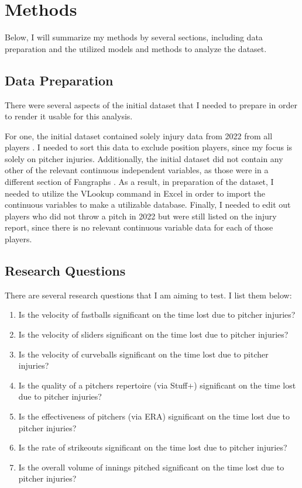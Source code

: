 \documentclass{article}
\begin{document}
\section{Methods}

Below, I will summarize my methods by several sections, including data preparation and the utilized models and methods to analyze the dataset.

\subsection{Data Preparation}

There were several aspects of the initial dataset that I needed to prepare in order to render it usable for this analysis. 

For one, the initial dataset contained solely injury data from 2022 from all players \citet{fginjurydata}. I needed to sort this data to exclude position players, since my focus is solely on pitcher injuries. Additionally, the initial dataset did not contain any other of the relevant continuous independent variables, as those were in a different section of Fangraphs \citet{fgleaderboards}. As a result, in preparation of the dataset, I needed to utilize the VLookup command in Excel in order to import the continuous variables to make a utilizable database. Finally, I needed to edit out players who did not throw a pitch in 2022 but were still listed on the injury report, since there is no relevant continuous variable data for each of those players. 

\subsection{Research Questions}

There are several research questions that I am aiming to test. I list them below:

\begin{enumerate}
  \def\labelenumi{\arabic{enumi}.}
  \item
    Is the velocity of fastballs significant on the time lost due to pitcher injuries?
  \item
    Is the velocity of sliders significant on the time lost due to pitcher injuries?
  \item
    Is the velocity of curveballs significant on the time lost due to pitcher injuries?
  \item
    Is the quality of a pitchers repertoire (via Stuff+) significant on the time lost due to pitcher injuries?
  \item
    Is the effectiveness of pitchers (via ERA) significant on the time lost due to pitcher injuries?
  \item
    Is the rate of strikeouts significant on the time lost due to pitcher injuries?
  \item
    Is the overall volume of innings pitched significant on the time lost due to pitcher injuries?
\end{enumerate}
\end{document}
